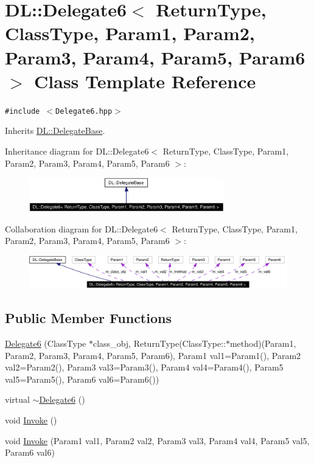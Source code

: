 \hypertarget{classDL_1_1Delegate6}{
\section{DL::Delegate6$<$ Return\-Type, Class\-Type, Param1, Param2, Param3, Param4, Param5, Param6 $>$ Class Template Reference}
\label{classDL_1_1Delegate6}
}
{\tt \#include $<$Delegate6.hpp$>$}

Inherits \hyperlink{classDL_1_1DelegateBase}{DL::Delegate\-Base}.

Inheritance diagram for DL::Delegate6$<$ Return\-Type, Class\-Type, Param1, Param2, Param3, Param4, Param5, Param6 $>$:\begin{figure}[H]
\begin{center}
\leavevmode
\includegraphics[width=239pt]{classDL_1_1Delegate6__inherit__graph}
\end{center}
\end{figure}
Collaboration diagram for DL::Delegate6$<$ Return\-Type, Class\-Type, Param1, Param2, Param3, Param4, Param5, Param6 $>$:\begin{figure}[H]
\begin{center}
\leavevmode
\includegraphics[width=369pt]{classDL_1_1Delegate6__coll__graph}
\end{center}
\end{figure}
\subsection*{Public Member Functions}
\begin{CompactItemize}
\item 
\hyperlink{classDL_1_1Delegate6_a0}{Delegate6} (Class\-Type $\ast$class\_\-obj, Return\-Type(Class\-Type::$\ast$method)(Param1, Param2, Param3, Param4, Param5, Param6), Param1 val1=Param1(), Param2 val2=Param2(), Param3 val3=Param3(), Param4 val4=Param4(), Param5 val5=Param5(), Param6 val6=Param6())
\item 
virtual \hyperlink{classDL_1_1Delegate6_a1}{$\sim$Delegate6} ()
\item 
void \hyperlink{classDL_1_1Delegate6_a2}{Invoke} ()
\item 
void \hyperlink{classDL_1_1Delegate6_a3}{Invoke} (Param1 val1, Param2 val2, Param3 val3, Param4 val4, Param5 val5, Param6 val6)
\end{CompactItemize}
